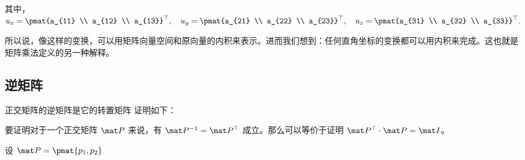 其中，$u_{x} = \pmat{a_{11} \\ a_{12} \\ a_{13}}^{\top}, \quad u_{y} = \pmat{a_{21} \\ a_{22} \\ a_{23}}^{\top}, \quad u_{z} = \pmat{a_{31} \\ a_{32} \\ a_{33}}^{\top}.$

所以说，像这样的变换，可以用矩阵向量空间和原向量的内积来表示。进而我们想到：任何直角坐标的变换都可以用内积来完成。这也就是矩阵乘法定义的另一种解释。



\subsection{逆矩阵}

\begin{theorem}{正交矩阵的逆矩阵是它的转置矩阵}
证明如下：

要证明对于一个正交矩阵 $\mat P$ 来说，有 $\mat P^{-1} = \mat P^{\top} $ 成立。那么可以等价于证明 $\mat P^{\top} \cdot \mat P = \mat I$。

设 $\mat P = \pmat{p_{1}, p_{2}}$
\end{theorem}



